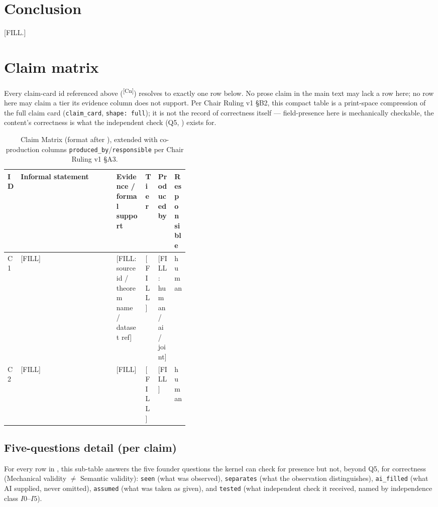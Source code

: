 \documentclass[10pt,twocolumn]{article}
\newcommand{\claimref}[1]{\textsuperscript{[#1]}}
\begin{document}
\section{Conclusion}
\label{sec:conclusion}
[FILL.]

\appendix

\section{Claim matrix}
\label{sec:claim-matrix}
Every claim-card id referenced above (\claimref{Cn}) resolves to exactly one
row below. No prose claim in the main text may lack a row here; no row here
may claim a tier its evidence column does not support. Per Chair Ruling v1
\S B2, this compact table is a print-space compression of the full claim
card (\texttt{claim\_card}, \texttt{shape: full}); it is not the record of
correctness itself --- field-presence here is mechanically checkable, the
content's correctness is what the independent check (Q5, ) exists for.

\begin{table}[t]
\centering
\scriptsize
\begin{tabularx}{\linewidth}{@{}p{0.035\linewidth} X p{0.16\linewidth} p{0.06\linewidth} p{0.09\linewidth} p{0.08\linewidth}@{}}
\toprule
\textbf{ID} & \textbf{Informal statement} & \textbf{Evidence / formal support} & \textbf{Tier} & \textbf{Produced by} & \textbf{Responsible} \\
\midrule
C1 & [FILL] & [FILL: source id / theorem name / dataset ref] & [FILL] & [FILL: human / ai / joint] & human \\
C2 & [FILL] & [FILL] & [FILL] & [FILL] & human \\
\bottomrule
\end{tabularx}
\caption{Claim Matrix (format after \citealp{lahtee2026zeroreadout}), extended with co-production columns \texttt{produced\_by}/\texttt{responsible} per Chair Ruling v1 \S A3.}
\label{tab:claim-matrix}
\end{table}

\subsection{Five-questions detail (per claim)}
\label{sec:five-questions}
For every row in , this sub-table answers the five
founder questions the kernel can check for presence but not, beyond Q5, for
correctness (Mechanical validity $\neq$ Semantic validity):
\texttt{seen} (what was observed), \texttt{separates} (what the observation
distinguishes), \texttt{ai\_filled} (what AI supplied, never omitted),
\texttt{assumed} (what was taken as given), and \texttt{tested}
(what independent check it received, named by independence class
\(I0\)--\(I5\)).
\end{document}
